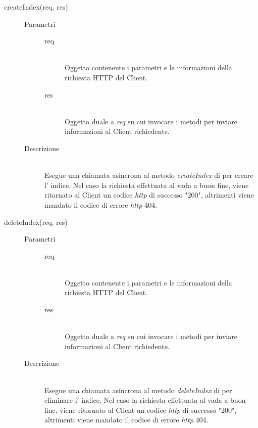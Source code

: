 \begin{description}
\begin{description}
      \item[createIndex(req, res)] \hfill 
           \begin{description}
           \item[Parametri] \hfill
            \begin{description}
             \item[req] \hfill \\
             Oggetto contenente i parametri e le informazioni della richiesta HTTP del Client.
             \item[res] \hfill \\
             Oggetto duale a \textit{req} su cui invocare i metodi per inviare informazioni al Client richiedente.
            \end{description}
           \item[Descrizione] \hfill \\
           Esegue una chiamata asincrona al metodo \textit{createIndex} di  per creare l' indice. Nel caso la richiesta effettuata al  vada a buon fine, viene ritornato al Client un codice \textit{http} di successo "200", altrimenti viene mandato il codice di errore \textit{http} 404.
           \end{description}
           
      \item[deleteIndex(req, res)] \hfill 
                 \begin{description}
                 \item[Parametri] \hfill
                  \begin{description}
                   \item[req] \hfill \\
                   Oggetto contenente i parametri e le informazioni della richiesta HTTP del Client.
                   \item[res] \hfill \\
                   Oggetto duale a \textit{req} su cui invocare i metodi per inviare informazioni al Client richiedente.
                  \end{description}
                 \item[Descrizione] \hfill \\
                 Esegue una chiamata asincrona al metodo \textit{deleteIndex} di  per eliminare l' indice. Nel caso la richiesta effettuata al  vada a buon fine, viene ritornato al Client un codice \textit{http} di successo "200", altrimenti viene mandato il codice di errore \textit{http} 404.
                 \end{description}
  
  
 \end{description}
 
\end{description} %


